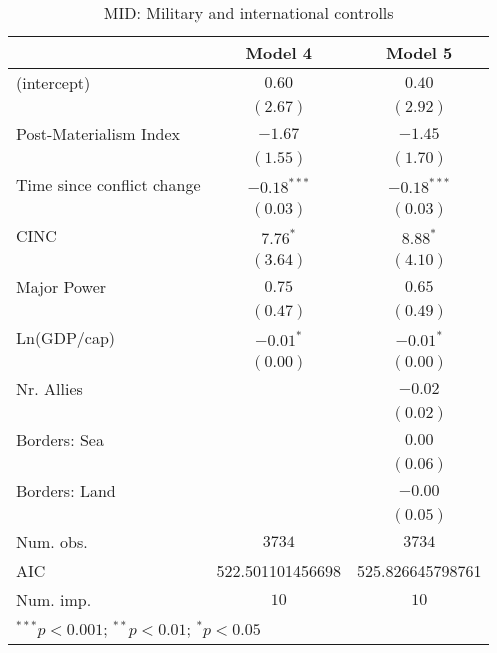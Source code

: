 
\begin{table}
\begin{center}
\begin{tabular}{l c c}
\toprule
 & Model 4 & Model 5 \\
\midrule
(intercept)                & $0.60$           & $0.40$           \\
                           & $(2.67)$         & $(2.92)$         \\
Post-Materialism Index     & $-1.67$          & $-1.45$          \\
                           & $(1.55)$         & $(1.70)$         \\
Time since conflict change & $-0.18^{***}$    & $-0.18^{***}$    \\
                           & $(0.03)$         & $(0.03)$         \\
CINC                       & $7.76^{*}$       & $8.88^{*}$       \\
                           & $(3.64)$         & $(4.10)$         \\
Major Power                & $0.75$           & $0.65$           \\
                           & $(0.47)$         & $(0.49)$         \\
Ln(GDP/cap)                & $-0.01^{*}$      & $-0.01^{*}$      \\
                           & $(0.00)$         & $(0.00)$         \\
Nr. Allies                 &                  & $-0.02$          \\
                           &                  & $(0.02)$         \\
Borders: Sea               &                  & $0.00$           \\
                           &                  & $(0.06)$         \\
Borders: Land              &                  & $-0.00$          \\
                           &                  & $(0.05)$         \\
\midrule
Num. obs.                  & $3734$           & $3734$           \\
AIC                        & 522.501101456698 & 525.826645798761 \\
Num. imp.                  & $10$             & $10$             \\
\bottomrule
\multicolumn{3}{l}{\scriptsize{$^{***}p<0.001$; $^{**}p<0.01$; $^{*}p<0.05$}}
\end{tabular}
\caption{MID: Military and international controlls}
\label{MID_2_PM}
\end{center}
\end{table}
